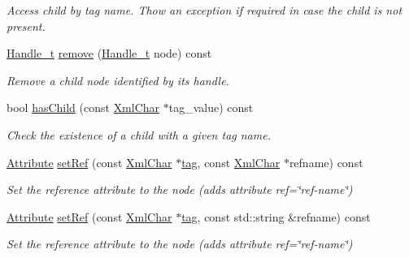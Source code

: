 \begin{DoxyCompactItemize}
\begin{DoxyCompactList}\small\item\em Access child by tag name. Thow an exception if required in case the child is not present. \end{DoxyCompactList}\item 
\hyperlink{class_d_d4hep_1_1_x_m_l_1_1_handle__t}{Handle\+\_\+t} \hyperlink{class_d_d4hep_1_1_x_m_l_1_1_element_a2588f94bc13d2007c159592715714bfc}{remove} (\hyperlink{class_d_d4hep_1_1_x_m_l_1_1_handle__t}{Handle\+\_\+t} node) const
\begin{DoxyCompactList}\small\item\em Remove a child node identified by its handle. \end{DoxyCompactList}\item 
bool \hyperlink{class_d_d4hep_1_1_x_m_l_1_1_element_a82f7e8b99c40187c6c3b0aaee2aab032}{has\+Child} (const \hyperlink{namespace_d_d4hep_1_1_x_m_l_a09e5d9cc86ed782f6826dfe0778c1815}{Xml\+Char} $\ast$tag\+\_\+value) const
\begin{DoxyCompactList}\small\item\em Check the existence of a child with a given tag name. \end{DoxyCompactList}\item 
\hyperlink{namespace_d_d4hep_1_1_x_m_l_a5c19b7116be99d69b4b22d911357baaf}{Attribute} \hyperlink{class_d_d4hep_1_1_x_m_l_1_1_element_a92194598196bdb19571df9c69e47e642}{set\+Ref} (const \hyperlink{namespace_d_d4hep_1_1_x_m_l_a09e5d9cc86ed782f6826dfe0778c1815}{Xml\+Char} $\ast$\hyperlink{class_d_d4hep_1_1_x_m_l_1_1_element_ade0bb178aee242e967d48be672c66b1d}{tag}, const \hyperlink{namespace_d_d4hep_1_1_x_m_l_a09e5d9cc86ed782f6826dfe0778c1815}{Xml\+Char} $\ast$refname) const
\begin{DoxyCompactList}\small\item\em Set the reference attribute to the node (adds attribute ref=\char`\"{}ref-\/name\char`\"{}) \end{DoxyCompactList}\item 
\hyperlink{namespace_d_d4hep_1_1_x_m_l_a5c19b7116be99d69b4b22d911357baaf}{Attribute} \hyperlink{class_d_d4hep_1_1_x_m_l_1_1_element_ab2caeeb8220e43f9480f15e3006c784c}{set\+Ref} (const \hyperlink{namespace_d_d4hep_1_1_x_m_l_a09e5d9cc86ed782f6826dfe0778c1815}{Xml\+Char} $\ast$\hyperlink{class_d_d4hep_1_1_x_m_l_1_1_element_ade0bb178aee242e967d48be672c66b1d}{tag}, const std\+::string \&refname) const
\begin{DoxyCompactList}\small\item\em Set the reference attribute to the node (adds attribute ref=\char`\"{}ref-\/name\char`\"{}) \end{DoxyCompactList}\item 

\end{DoxyCompactItemize}

